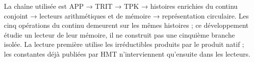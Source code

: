 % 
% 
% 
La chaîne utilisée est APP → TRIT → TPK → histoires enrichies du continu conjoint → lecteurs arithmétiques et de mémoire → représentation circulaire. Les cinq opérations du continu demeurent sur les mêmes histoires ; ce développement étudie un lecteur de leur mémoire, il ne construit pas une cinquième branche isolée. La lecture première utilise les irréductibles produits par le produit natif ; les constantes déjà publiées par HMT n'interviennent qu'ensuite dans les lecteurs.

